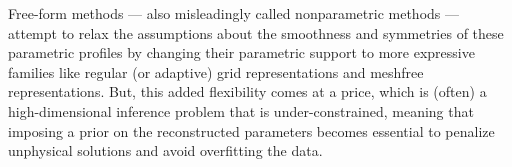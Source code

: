 Free-form methods --- also misleadingly called nonparametric methods ---
attempt to relax the assumptions about the smoothness and symmetries of these parametric profiles 
by changing their parametric support to more expressive families like regular (or adaptive)
grid representations and meshfree representations. 
But, this added flexibility comes at a price, which is (often) a high-dimensional inference problem that is under-constrained, meaning that imposing a prior on the reconstructed parameters becomes essential to penalize unphysical solutions and avoid overfitting the data. 
